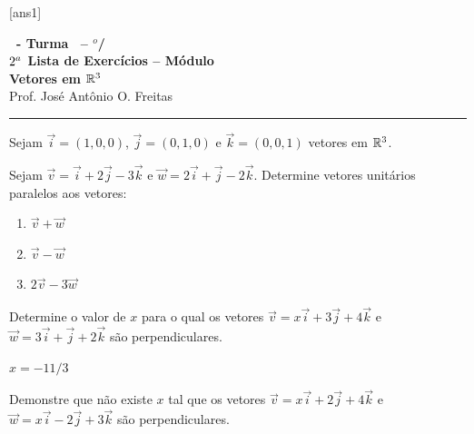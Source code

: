 \documentclass[12pt]{exam}
\begin{document}
[ans1]

\begin{center}
    {\Large\bf \disciplina\ - Turma \turma\ -- \semestre$^{o}$/\ano} \\ \vspace{9pt} {\large\bf
        $2^a$ Lista de Exercícios -- Módulo \numeromodulo\\ Vetores em $\mathbb{R}^3$}\\ \vspace{9pt} Prof. José Antônio O. Freitas
\end{center}

\hrule

\vspace{.6cm}

Sejam $\vec{i} = (1, 0, 0)$, $\vec{j} = (0, 1, 0)$ e $\vec{k} = (0, 0, 1)$ vetores em $\mathbb{R}^3$.

\begin{exercicio}
    Sejam $\vec{v} = \vec{i} + 2\vec{j} - 3\vec{k}$ e $ \vec{w} = 2\vec{i} + \vec{j} - 2\vec{k}$. Determine vetores unitários paralelos aos vetores:
    \begin{enumerate}[label=({\alph*})]
        \item $\vec{v} + \vec{w}$
        \item $\vec{v} - \vec{w}$
        \item $2\vec{v} - 3\vec{w}$
    \end{enumerate}
\end{exercicio}

\begin{exercicio}
    Determine o valor de $x$ para o qual os vetores $\vec{v} = x\vec{i} + 3\vec{j} + 4\vec{k}$ e $\vec{w} = 3\vec{i} + \vec{j} + 2\vec{k}$ são perpendiculares.
    \begin{solucao}
        $x = -11/3$
    \end{solucao}
\end{exercicio}

\begin{exercicio}
    Demonstre que não existe $x$ tal que os vetores $\vec{v} = x\vec{i} + 2\vec{j} + 4\vec{k}$ e $\vec{w} = x\vec{i} - 2\vec{j} + 3\vec{k}$ são perpendiculares.
\end{exercicio}
\end{document}
